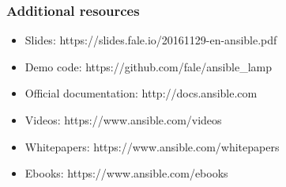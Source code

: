 \documentclass[t,aspectratio=169]{beamer}
\begin{document}
\begin{frame}
    \frametitle{Additional resources}
    \begin{itemize}
        \item Slides: https://slides.fale.io/20161129-en-ansible.pdf
        \item Demo code: https://github.com/fale/ansible\_lamp
        \item Official documentation: http://docs.ansible.com
        \item Videos: https://www.ansible.com/videos
        \item Whitepapers: https://www.ansible.com/whitepapers
        \item Ebooks: https://www.ansible.com/ebooks
    \end{itemize}
\end{frame}

\makethanks
\end{document}
